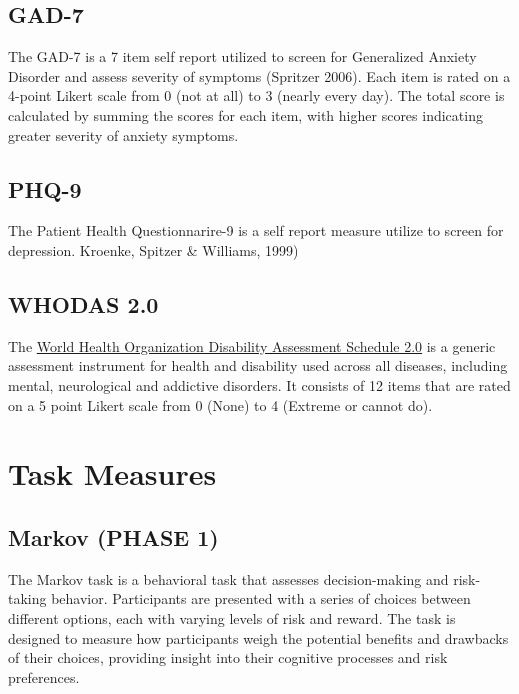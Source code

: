 \documentclass[
]{book}
\begin{document}
\section{GAD-7}\label{gad-7}

The GAD-7 is a 7 item self report utilized to screen for Generalized
Anxiety Disorder and assess severity of symptoms (Spritzer 2006). Each
item is rated on a 4-point Likert scale from 0 (not at all) to 3 (nearly
every day). The total score is calculated by summing the scores for each
item, with higher scores indicating greater severity of anxiety
symptoms.

\section{PHQ-9}\label{phq-9}

The Patient Health Questionnarire-9 is a self report measure utilize to
screen for depression. Kroenke, Spitzer \& Williams, 1999)

\section{WHODAS 2.0}\label{whodas-2.0}

The \href{https://www.who.int/standards/classifications/international-classification-of-functioning-disability-and-health/who-disability-assessment-schedule}{World Health Organization Disability Assessment Schedule
2.0}
is a generic assessment instrument for health and disability used across
all diseases, including mental, neurological and addictive disorders. It consists of 12 items that are rated on a 5 point Likert scale from 0 (None) to 4 (Extreme or cannot do).

\chapter{Task Measures}\label{task-measures}

\section{Markov (PHASE 1)}\label{markov-phase-1}

The Markov task is a behavioral task that assesses decision-making and risk-taking behavior. Participants are presented with a series of choices between different options, each with varying levels of risk and reward. The task is designed to measure how participants weigh the potential benefits and drawbacks of their choices, providing insight into their cognitive processes and risk preferences.
\end{document}
